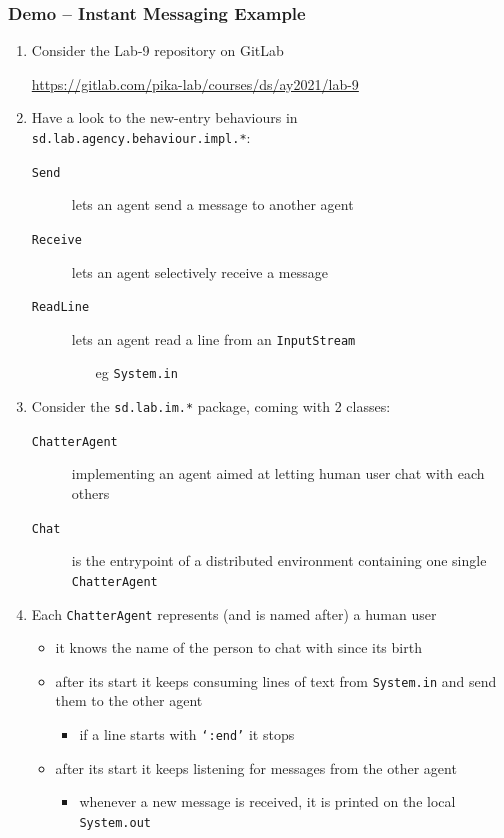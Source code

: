 \documentclass[presentation]{beamer}\mode<presentation>{\usetheme{AMSCesenaPurpleAndGold}}
\newcommand{\labN}{9}
\newcommand{\labGroup}{https://gitlab.com/pika-lab/courses/ds/ay2021}
\newcommand{\labRepo}{\labGroup/lab-\labN}
\begin{document}
\begin{frame}[allowframebreaks]
	\frametitle{Demo \currentDemo{} -- Instant Messaging Example}

	\begin{enumerate}
		\item Consider the Lab-\labN{} repository on GitLab
		\begin{center}
			\url{\labRepo}
		\end{center}

		\medskip

		\item Have a look to the new-entry behaviours in \texttt{sd.lab.agency.behaviour.impl.*}:
		\begin{description}
			\item[\texttt{Send}] lets an agent send a message to another agent
			\item[\texttt{Receive}] lets an agent selectively receive a message
			\item[\texttt{ReadLine}] lets an agent read a line from an \texttt{InputStream}
			\begin{itemize}
				\item[eg] \texttt{System.in}
			\end{itemize} 
		\end{description}

		\medskip

		\item Consider the \texttt{sd.lab.im.*} package, coming with 2 classes:
		\begin{description}
			\item[\texttt{ChatterAgent}] implementing an agent aimed at letting human user chat with each others
			\item[\texttt{Chat}] is the entrypoint of a distributed environment containing one single \texttt{ChatterAgent}  
		\end{description}

		\medskip

		\item Each \texttt{ChatterAgent} represents (and is named after) a human user
		\begin{itemize}
			\item it knows the \alert{name} of the person to chat with since its birth
			\item after its start it keeps consuming lines of text from \texttt{System.in} and send them to the other agent
			\begin{itemize}
				\item if a line starts with \texttt{`:end'} it stops
			\end{itemize}
			\item after its start it keeps listening for messages from the other agent 
			\begin{itemize}
				\item whenever a new message is received, it is printed on the local \texttt{System.out}
			\end{itemize}
		\end{itemize}


\end{enumerate}
\end{frame}
\end{document}
